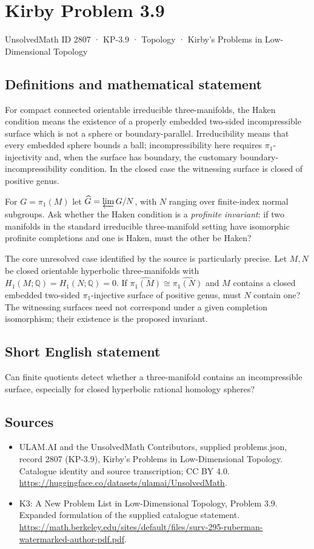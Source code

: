 \documentclass[11pt,a4paper]{article}
\begin{document}
\section*{Kirby Problem 3.9}\label{2807}
{\small UnsolvedMath ID 2807 · KP-3.9 · Topology · Kirby's Problems in Low-Dimensional Topology}
\subsection{Definitions and mathematical statement}
For compact connected orientable irreducible three-manifolds, the Haken
condition means the existence of a properly embedded two-sided incompressible
surface which is not a sphere or boundary-parallel. Irreducibility means that
every embedded sphere bounds a ball; incompressibility here requires
$\pi_1$-injectivity and, when the surface has boundary, the customary
boundary-incompressibility condition. In the closed case the witnessing
surface is closed of positive genus.

For $G=\pi_1(M)$ let $\widehat G=\varprojlim G/N$, with $N$ ranging over
finite-index normal subgroups. Ask whether the Haken condition is a
\emph{profinite invariant}: if two manifolds in the standard irreducible
three-manifold setting have isomorphic profinite completions and one is
Haken, must the other be Haken?

The core unresolved case identified by the source is particularly precise.
Let $M,N$ be closed orientable hyperbolic three-manifolds with
$H_1(M;\mathbb Q)=H_1(N;\mathbb Q)=0$. If
$\widehat{\pi_1(M)}\cong\widehat{\pi_1(N)}$ and $M$ contains a closed
embedded two-sided $\pi_1$-injective surface of positive genus, must $N$
contain one? The witnessing surfaces need not correspond under a given
completion isomorphism; their existence is the proposed invariant.
\subsection{Short English statement}
Can finite quotients detect whether a three-manifold contains an incompressible surface, especially for closed hyperbolic rational homology spheres?
\subsection{Sources}
\begin{itemize}
\item[S1] ULAM.AI and the UnsolvedMath Contributors, supplied problems.json, record 2807 (KP-3.9), Kirby's Problems in Low-Dimensional Topology. Catalogue identity and source transcription; CC BY 4.0.
\url{https://huggingface.co/datasets/ulamai/UnsolvedMath}.
\item[S2] K3: A New Problem List in Low-Dimensional Topology, Problem 3.9. Expanded formulation of the supplied catalogue statement.
\url{https://math.berkeley.edu/sites/default/files/surv-295-ruberman-watermarked-author-pdf.pdf}.
\end{itemize}
\end{document}

